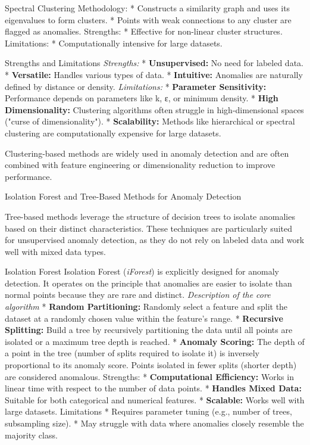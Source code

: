 \secc Spectral Clustering
Methodology:
\begitems
* Constructs a similarity graph and uses its eigenvalues to form clusters.
* Points with weak connections to any cluster are flagged as anomalies.
\enditems
Strengths:
\begitems
* Effective for non-linear cluster structures.
\enditems
Limitations:
\begitems
* Computationally intensive for large datasets.
\enditems

\secc Strengths and Limitations
{\em Strengths:}
\begitems
* {\bf Unsupervised:} No need for labeled data.
* {\bf Versatile:} Handles various types of data.
* {\bf Intuitive:} Anomalies are naturally defined by distance or density.
\enditems
{\em Limitations:}
\begitems
* {\bf Parameter Sensitivity:} Performance depends on parameters like k, ε, or minimum density.
* {\bf High Dimensionality:} Clustering algorithms often struggle in high-dimensional spaces ("curse of dimensionality").
* {\bf Scalability:} Methods like hierarchical or spectral clustering are computationally expensive for large datasets.
\enditems

Clustering-based methods are widely used in anomaly detection and are often combined with feature engineering or dimensionality reduction to improve performance.

\sec Isolation Forest and Tree-Based Methods for Anomaly Detection

Tree-based methods leverage the structure of decision trees to isolate anomalies based on their distinct characteristics. These techniques are particularly suited for unsupervised anomaly detection, as they do not rely on labeled data and work well with mixed data types.

\secc Isolation Forest
Isolation Forest ({\em iForest}) is explicitly designed for anomaly detection. It operates on the principle that anomalies are easier to isolate than normal points because they are rare and distinct.
\nl
{\em Description of the core algorithm}
\begitems
* {\bf Random Partitioning:} Randomly select a feature and split the dataset at a randomly chosen value within the feature's range.
* {\bf Recursive Splitting:} Build a tree by recursively partitioning the data until all points are isolated or a maximum tree depth is reached.
* {\bf Anomaly Scoring:} The depth of a point in the tree (number of splits required to isolate it) is inversely proportional to its anomaly score. Points isolated in fewer splits (shorter depth) are considered anomalous.
\enditems
\nl
Strengths:
\begitems
* {\bf Computational Efficiency:} Works in linear time with respect to the number of data points.
* {\bf Handles Mixed Data:} Suitable for both categorical and numerical features.
* {\bf Scalable:} Works well with large datasets.
\enditems
\nl
Limitations
\begitems
* Requires parameter tuning (e.g., number of trees, subsampling size).
* May struggle with data where anomalies closely resemble the majority class.
\enditems

